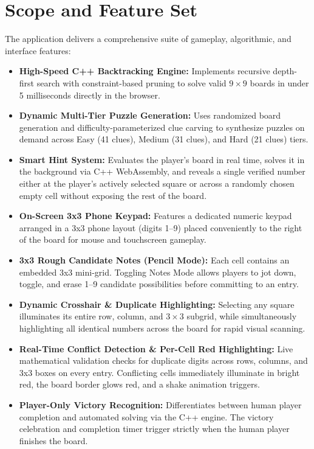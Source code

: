 \documentclass[12pt,a4paper,oneside]{book}
\begin{document}
\section{Scope and Feature Set}
The application delivers a comprehensive suite of gameplay, algorithmic, and interface features:
\begin{itemize}
    \item \textbf{High-Speed C++ Backtracking Engine:} Implements recursive depth-first search with constraint-based pruning to solve valid $9 \times 9$ boards in under 5 milliseconds directly in the browser.
    \item \textbf{Dynamic Multi-Tier Puzzle Generation:} Uses randomized board generation and difficulty-parameterized clue carving to synthesize puzzles on demand across Easy (41 clues), Medium (31 clues), and Hard (21 clues) tiers.
    \item \textbf{Smart Hint System:} Evaluates the player's board in real time, solves it in the background via C++ WebAssembly, and reveals a single verified number either at the player's actively selected square or across a randomly chosen empty cell without exposing the rest of the board.
    \item \textbf{On-Screen 3x3 Phone Keypad:} Features a dedicated numeric keypad arranged in a 3x3 phone layout (digits 1--9) placed conveniently to the right of the board for mouse and touchscreen gameplay.
    \item \textbf{3x3 Rough Candidate Notes (Pencil Mode):} Each cell contains an embedded 3x3 mini-grid. Toggling Notes Mode allows players to jot down, toggle, and erase 1--9 candidate possibilities before committing to an entry.
    \item \textbf{Dynamic Crosshair \& Duplicate Highlighting:} Selecting any square illuminates its entire row, column, and $3 \times 3$ subgrid, while simultaneously highlighting all identical numbers across the board for rapid visual scanning.
    \item \textbf{Real-Time Conflict Detection \& Per-Cell Red Highlighting:} Live mathematical validation checks for duplicate digits across rows, columns, and 3x3 boxes on every entry. Conflicting cells immediately illuminate in bright red, the board border glows red, and a shake animation triggers.
    \item \textbf{Player-Only Victory Recognition:} Differentiates between human player completion and automated solving via the C++ engine. The victory celebration and completion timer trigger strictly when the human player finishes the board.

\end{itemize}
\end{document}
